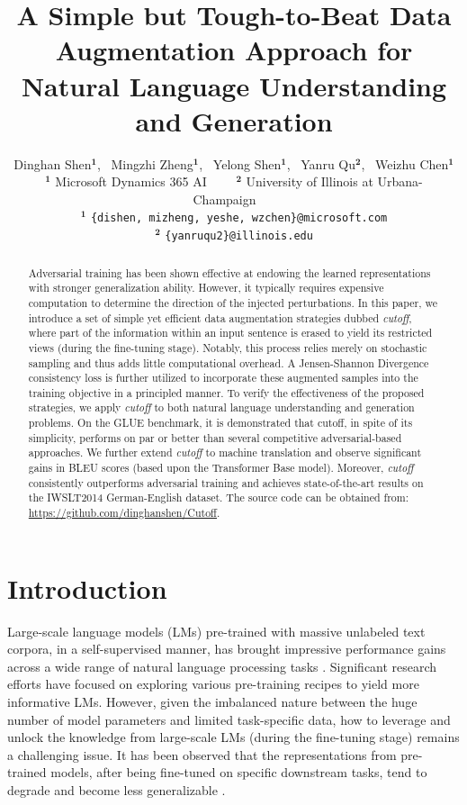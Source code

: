 \documentclass[11pt,a4paper]{article}
\title{A Simple but Tough-to-Beat Data Augmentation Approach for \\ 
    Natural Language Understanding and Generation}
\author{Dinghan Shen$^{\mathbf{1}}$, ~Mingzhi Zheng$^{\mathbf{1}}$, ~Yelong Shen$^{\mathbf{1}}$, ~Yanru Qu$^{\mathbf{2}}$, ~Weizhu Chen$^{\mathbf{1}}$ \\
	\smallskip 
	$^{\mathbf{1}}$ Microsoft Dynamics 365 AI~~~~
	$^{\mathbf{2}}$ University of Illinois at Urbana-Champaign~~~ \\
	\smallskip
	$^{\mathbf{1}}$ {\tt \{dishen, mizheng, yeshe, wzchen\}@microsoft.com} \\
	$^{\mathbf{2}}$ {\tt \{yanruqu2\}@illinois.edu} \\
  }
\begin{document}
\maketitle

\begin{abstract}
Adversarial training has been shown effective at endowing the learned representations with stronger generalization ability. However, it typically requires expensive computation to determine the direction of the injected perturbations. In this paper, we introduce a set of simple yet efficient data augmentation strategies dubbed \emph{cutoff}, where part of the information within an input sentence is erased to yield its restricted views (during the fine-tuning stage). 
Notably, this process relies merely on stochastic sampling and thus adds little computational overhead.
A Jensen-Shannon Divergence consistency loss is further utilized to incorporate these augmented samples into the training objective in a principled manner.
To verify the effectiveness of the proposed strategies, we apply \emph{cutoff} to both natural language understanding and generation problems. 
On the GLUE benchmark, it is demonstrated that cutoff, in spite of its simplicity, performs on par or better than several competitive adversarial-based approaches.
We further extend \emph{cutoff} to machine translation and observe significant gains in BLEU scores (based upon the Transformer Base model). Moreover, \emph{cutoff} consistently outperforms adversarial training and achieves state-of-the-art results on the IWSLT2014 German-English dataset.
The source code can be obtained from: \url{https://github.com/dinghanshen/Cutoff}.
\end{abstract}

\section{Introduction} 
Large-scale language models (LMs) pre-trained with massive unlabeled text corpora, in a self-supervised manner, has brought impressive performance gains across a wide range of natural language processing tasks \cite{devlin2018bert, liu2019roberta, yang2019xlnet, joshi2019spanbert, sun2019ernie, clark2019electra, lewis2019bart, bao2020unilmv2, he2020deberta}. Significant research efforts have focused on exploring various pre-training recipes to yield more informative LMs. However, given the imbalanced nature between the huge number of model parameters and limited task-specific data, how to leverage and unlock the knowledge from large-scale LMs (during the fine-tuning stage) remains a challenging issue. It has been observed that the representations from pre-trained models, after being fine-tuned on specific downstream tasks, tend to degrade and become less generalizable \cite{zhu2019freelb, jiang2019smart, aghajanyan2020better}.
\end{document}
